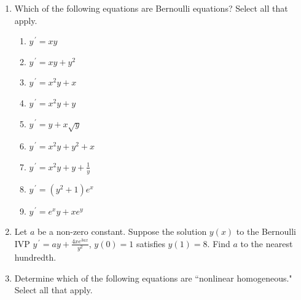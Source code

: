 \documentclass{ximera}
\begin{document}
\begin{enumerate}[label=(\arabic*)]






 \item Which of the following equations are Bernoulli equations?   Select all that apply.

\begin{enumerate}[label=(\alph*)]
\item $y^{\,\prime}=xy$
\item $y^{\,\prime}=xy+y^2$ %
\item $y^{\,\prime}=x^2y+x$
\item $y^{\,\prime}=x^2y+y$
\item $y^{\,\prime}=y+x\sqrt{y}$  %
\item $y^{\,\prime}=x^2y+y^2+x$ 
\item $y^{\,\prime}=x^2y+y+\frac{1}{y}$   %
\item $y^{\,\prime}=(y^2+1)e^x$  
\item $y^{\,\prime}=e^x y +x e^y$ 
\end{enumerate}






\item Let $a$ be a non-zero constant.  Suppose the solution $y(x)$ to the Bernoulli IVP $\displaystyle y^{\,\prime}=ay+\frac{4xe^{3ax}}{y^2}$, $y(0)=1$ satisfies $y(1)=8$.  Find $a$ to the nearest hundredth. 






\newpage

\item Determine which of the following equations are ``nonlinear homogeneous."  Select all that apply.


\end{enumerate}
\end{document}
